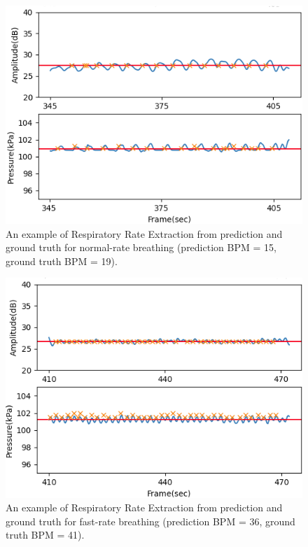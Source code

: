 \documentclass[10pt,letterpaper]{article}
\begin{document}
		\begin{figure}[htbp]
			\centerline{\includegraphics[width=120mm,scale=0.9]{PD2GT_NORMAL01.png}}
			\caption{An example of Respiratory Rate Extraction from prediction and ground truth for normal-rate breathing (prediction BPM = 15, ground truth BPM = 19).}
			\label{fig:RREXT_NORMAL}
		\end{figure}
	\begin{figure}[htbp]
		\centerline{\includegraphics[width=120mm,scale=0.9]{PD2GT_FAST01.png}}
		\caption{An example of Respiratory Rate Extraction from prediction and ground truth for fast-rate breathing (prediction BPM = 36, ground truth BPM = 41).}
		\label{fig:RREXT_FAST}
	\end{figure}
\end{document}
